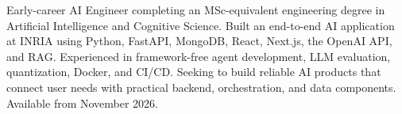 
\begin{cvparagraph}
Early-career AI Engineer completing an MSc-equivalent engineering degree in Artificial Intelligence and Cognitive Science. Built an end-to-end AI application at INRIA using Python, FastAPI, MongoDB, React, Next.js, the OpenAI API, and RAG. Experienced in framework-free agent development, LLM evaluation, quantization, Docker, and CI/CD. Seeking to build reliable AI products that connect user needs with practical backend, orchestration, and data components. Available from November 2026.
\end{cvparagraph}
